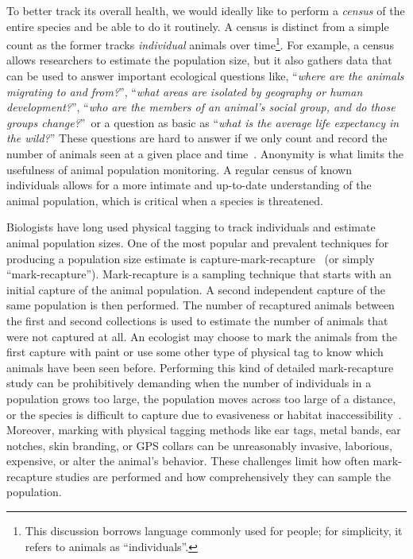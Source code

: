 To better track its overall health, we would ideally like to perform a \textit{census} of the entire species and be able to do it routinely.  A census is distinct from a simple count as the former tracks \textit{individual} animals over time\footnote{This discussion borrows language commonly used for people; for simplicity, it refers to animals as ``individuals''.}.  For example, a census allows researchers to estimate the population size, but it also gathers data that can be used to answer important ecological questions like, ``\textit{where are the animals migrating to and from?}'', ``\textit{what areas are isolated by geography or human development?}'', ``\textit{who are the members of an animal's social group, and do those groups change?}''\ or a question as basic as ``\textit{what is the average life expectancy in the wild?}''  These questions are hard to answer if we only count and record the number of animals seen at a given place and time~\cite{fitzgibbon_antipredator_1995,ginsberg_social_1988,tombak_behavioral_2019,keesing_impacts_1998,kivai_feeding_2006,rubenstein_ecology_1994,zero_monitoring_2013}.  Anonymity is what limits the usefulness of animal population monitoring.  A regular census of known individuals allows for a more intimate and up-to-date understanding of the animal population, which is critical when a species is threatened.

Biologists have long used physical tagging to track individuals and estimate animal population sizes.  One of the most popular and prevalent techniques for producing a population size estimate is capture-mark-recapture~\cite{robson_sample_1964,pradel_utilization_1996} (or simply ``mark-recapture'').  Mark-recapture is a sampling technique that starts with an initial capture of the animal population.  A second independent capture of the same population is then performed. The number of recaptured animals between the first and second collections is used to estimate the number of animals that were not captured at all.  An ecologist may choose to mark the animals from the first capture with paint or use some other type of physical tag to know which animals have been seen before.  Performing this kind of detailed mark-recapture study can be prohibitively demanding when the number of individuals in a population grows too large, the population moves across too large of a distance, or the species is difficult to capture due to evasiveness or habitat inaccessibility~\cite{seber_estimation_1982}.  Moreover, marking with physical tagging methods like ear tags, metal bands, ear notches, skin branding, or GPS collars can be unreasonably invasive, laborious, expensive, or alter the animal's behavior.  These challenges limit how often mark-recapture studies are performed and how comprehensively they can sample the population.

